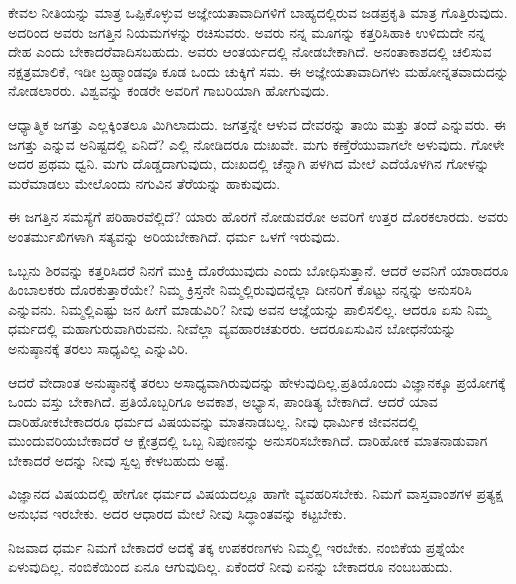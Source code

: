 \vskip 3pt

ಕೇವಲ ನೀತಿಯನ್ನು ಮಾತ್ರ ಒಪ್ಪಿಕೊಳ್ಳುವ ಅಜ್ಞೇಯತಾವಾದಿಗಳಿಗೆ ಬಾಹ್ಯದಲ್ಲಿರುವ ಜಡಪ್ರಕೃತಿ ಮಾತ್ರ ಗೊತ್ತಿರುವುದು. ಅದರಿಂದ ಅವರು ಜಗತ್ತಿನ ನಿಯಮಗಳನ್ನು ರಚಿಸುವರು. ಅವರು ನನ್ನ ಮೂಗನ್ನು ಕತ್ತರಿಸಿಹಾಕಿ ಉಳಿದುದೇ ನನ್ನ ದೇಹ ಎಂದು ಬೇಕಾದರೆ\break ವಾದಿಸಬಹುದು. ಅವರು ಆಂತರ್ಯದಲ್ಲಿ ನೋಡಬೇಕಾಗಿದೆ. ಅನಂತಾಕಾಶದಲ್ಲಿ ಚಲಿಸುವ ನಕ್ಷತ್ರಮಾಲಿಕೆ, ಇಡೀ ಬ್ರಹ್ಮಾಂಡವೂ ಕೂಡ ಒಂದು ಚುಕ್ಕಿಗೆ ಸಮ. ಈ ಅಜ್ಞೇಯತಾವಾದಿಗಳು ಮಹೋನ್ನತವಾದುದನ್ನು ನೋಡಲಾರರು. ವಿಶ್ವವನ್ನು ಕಂಡರೇ ಅವರಿಗೆ ಗಾಬರಿಯಾಗಿ ಹೋಗುವುದು.

\vskip 3pt

ಆಧ್ಯಾತ್ಮಿಕ ಜಗತ್ತು ಎಲ್ಲಕ್ಕಿಂತಲೂ ಮಿಗಿಲಾದುದು. ಜಗತ್ತನ್ನೇ ಆಳುವ ದೇವರನ್ನು ತಾಯಿ ಮತ್ತು ತಂದೆ ಎನ್ನುವರು. ಈ ಜಗತ್ತು ಎನ್ನುವ ಅನಿಷ್ಟದಲ್ಲಿ ಏನಿದೆ? ಎಲ್ಲಿ ನೋಡಿದರೂ ದುಃಖವೇ. ಮಗು ಕಣ್ತೆರೆಯುವಾಗಲೇ ಅಳುವುದು. ಗೋಳೇ ಅದರ ಪ್ರಥಮ ಧ್ವನಿ. ಮಗು ದೊಡ್ಡದಾಗುವುದು, ದುಃಖದಲ್ಲಿ ಚೆನ್ನಾಗಿ ಪಳಗಿದ ಮೇಲೆ ಎದೆಯೊಳಗಿನ ಗೋಳನ್ನು ಮರೆಮಾಡಲು ಮೇಲೊಂದು ನಗುವಿನ ತೆರೆಯನ್ನು ಹಾಕುವುದು.

\vskip 3pt

ಈ ಜಗತ್ತಿನ ಸಮಸ್ಯೆಗೆ ಪರಿಹಾರವೆಲ್ಲಿದೆ? ಯಾರು ಹೊರಗೆ ನೋಡುವರೋ ಅವರಿಗೆ ಉತ್ತರ ದೊರಕಲಾರದು. ಅವರು ಅಂತರ್ಮುಖಿಗಳಾಗಿ ಸತ್ಯವನ್ನು ಅರಿಯಬೇಕಾಗಿದೆ. ಧರ್ಮ ಒಳಗೆ ಇರುವುದು.

\vskip 3pt

ಒಬ್ಬನು ಶಿರವನ್ನು ಕತ್ತರಿಸಿದರೆ ನಿನಗೆ ಮುಕ್ತಿ ದೊರೆಯುವುದು ಎಂದು ಬೋಧಿಸುತ್ತಾನೆ. ಆದರೆ ಅವನಿಗೆ ಯಾರಾದರೂ ಹಿಂಬಾಲಕರು ದೊರಕುತ್ತಾರೆಯೇ? ನಿಮ್ಮ ಕ್ರಿಸ್ತನೇ ನಿಮ್ಮಲ್ಲಿರುವುದನ್ನೆಲ್ಲಾ ದೀನರಿಗೆ ಕೊಟ್ಟು ನನ್ನನ್ನು ಅನುಸರಿಸಿ ಎನ್ನುವನು. ನಿಮ್ಮಲ್ಲಿ\break ಎಷ್ಟು ಜನ ಹೀಗೆ ಮಾಡುವಿರಿ? ನೀವು ಅವನ ಆಜ್ಞೆಯನ್ನು ಪಾಲಿಸಲಿಲ್ಲ. ಆದರೂ ಏಸು ನಿಮ್ಮ ಧರ್ಮದಲ್ಲಿ ಮಹಾಗುರುವಾಗಿರುವನು. ನೀವೆಲ್ಲಾ ವ್ಯವಹಾರಚತುರರು. ಆದರೂ\break ಏಸುವಿನ ಬೋಧನೆಯನ್ನು ಅನುಷ್ಠಾನಕ್ಕೆ ತರಲು ಸಾಧ್ಯವಿಲ್ಲ ಎನ್ನುವಿರಿ.

\vskip 3pt

ಆದರೆ ವೇದಾಂತ ಅನುಷ್ಠಾನಕ್ಕೆ ತರಲು ಅಸಾಧ್ಯವಾಗಿರುವುದನ್ನು ಹೇಳುವುದಿಲ್ಲ.\break ಪ್ರತಿಯೊಂದು ವಿಜ್ಞಾನಕ್ಕೂ ಪ್ರಯೋಗಕ್ಕೆ ಒಂದು ವಸ್ತು ಬೇಕಾಗಿದೆ. ಪ್ರತಿಯೊಬ್ಬರಿಗೂ ಅವಕಾಶ, ಅಭ್ಯಾಸ, ಪಾಂಡಿತ್ಯ ಬೇಕಾಗಿದೆ. ಆದರೆ ಯಾವ ದಾರಿಹೋಕಬೇಕಾದರೂ ಧರ್ಮದ ವಿಷಯವನ್ನು ಮಾತನಾಡಬಲ್ಲ. ನೀವು ಧಾರ್ಮಿಕ ಜೀವನದಲ್ಲಿ ಮುಂದುವರಿಯಬೇಕಾದರೆ ಆ ಕ್ಷೇತ್ರದಲ್ಲಿ ಒಬ್ಬ ನಿಪುಣನನ್ನು ಅನುಸರಿಸಬೇಕಾಗಿದೆ. ದಾರಿಹೋಕ ಮಾತನಾಡುವಾಗ ಬೇಕಾದರೆ ಅದನ್ನು ನೀವು ಸ್ವಲ್ಪ ಕೇಳಬಹುದು ಅಷ್ಟೆ.

\vskip 3pt

ವಿಜ್ಞಾನದ ವಿಷಯದಲ್ಲಿ ಹೇಗೋ ಧರ್ಮದ ವಿಷಯದಲ್ಲೂ ಹಾಗೇ ವ್ಯವಹರಿಸಬೇಕು. ನಿಮಗೆ ವಾಸ್ತವಾಂಶಗಳ ಪ್ರತ್ಯಕ್ಷ ಅನುಭವ ಇರಬೇಕು. ಅದರ ಆಧಾರದ ಮೇಲೆ ನೀವು ಸಿದ್ಧಾಂತವನ್ನು ಕಟ್ಟಬೇಕು.

\vskip 4pt

ನಿಜವಾದ ಧರ್ಮ ನಿಮಗೆ ಬೇಕಾದರೆ ಅದಕ್ಕೆ ತಕ್ಕ ಉಪಕರಣಗಳು ನಿಮ್ಮಲ್ಲಿ ಇರಬೇಕು. ನಂಬಿಕೆಯ ಪ್ರಶ್ನೆಯೇ ಏಳುವುದಿಲ್ಲ. ನಂಬಿಕೆಯಿಂದ ಏನೂ ಆಗುವುದಿಲ್ಲ. ಏಕೆಂದರೆ ನೀವು ಏನನ್ನು ಬೇಕಾದರೂ ನಂಬಬಹುದು.

\vskip 4pt

